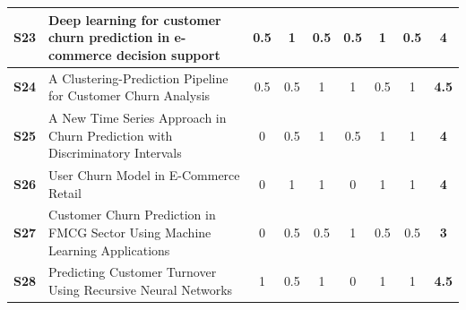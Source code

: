 \begin{table}[H]
{\begin{tabular}{|l|l|c|c|c|c|c|c|c|}
\hline
\rowcolor{lightgray} \textbf{S23}                                    & Deep learning for customer churn prediction in e-commerce decision support \cite{S23-ID396-Pondel}                                                                                                                                                          & 0.5        & 1          & 0.5        & 0.5        & 1          & 0.5        & \textbf{4}     \\ 
\hline
\textbf{S24}                                                                      & A Clustering-Prediction Pipeline for Customer Churn Analysis \cite{S24-ID414-Zheng}                                                                                                                                                                        & 0.5        & 0.5        & 1          & 1          & 0.5        & 1          & \textbf{4.5}     \\ 
\hline
\rowcolor{lightgray} \textbf{S25}                                    & A New Time Series Approach in Churn Prediction with Discriminatory Intervals \cite{S25-ID417-Ahmadi}                                                                                                                                                        & 0          & 0.5        & 1          & 0.5        & 1          & 1          & \textbf{4}     \\ 
\hline
\textbf{S26}                                                                      & User Churn Model in E-Commerce Retail \cite{S26-ID442-Fridrich}                                                                                                                                                                                               & 0          & 1          & 1          & 0          & 1          & 1          & \textbf{4}     \\ 
\hline
\rowcolor{lightgray} \textbf{S27}                                    & Customer Churn Prediction in FMCG Sector Using Machine Learning Applications \cite{S27-ID471-Gunesen}                                                                                                                                                        & 0          & 0.5        & 0.5        & 1          & 0.5        & 0.5        & \textbf{3}     \\ 
\hline
\textbf{S28}                                                                      & Predicting Customer Turnover Using Recursive Neural Networks \cite{S28-ID472-Chashmi}                                                                                                                                                                        & 1          & 0.5        & 1          & 0          & 1          & 1          & \textbf{4.5}     \\ 

\end{tabular}}
\end{table}

